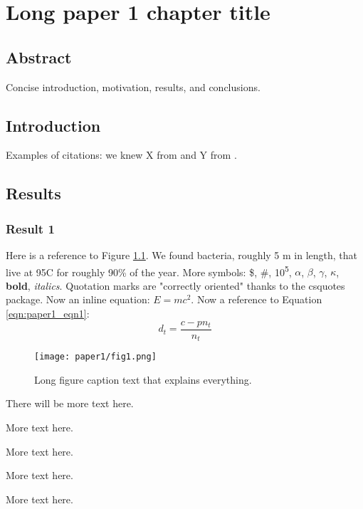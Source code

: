 \documentclass[main.tex]{subfiles}
\begin{document}
\chapter{Long paper 1 chapter title}

\section{Abstract}
Concise introduction, motivation, results, and conclusions.

\section{Introduction}
Examples of citations: we knew X from \cite{Croote201616022} and Y from \cite{Croote20181306}.

\section{Results}
\subsection{Result 1}
Here is a reference to Figure \ref{fig:paper1_fig1}.
We found bacteria, roughly 5 \si{\mu}m in length, that live at 95\degree C for roughly 90\% of the year. More symbols: \$, \#, 10\textsuperscript{5}, $\alpha$, $\beta$, $\gamma$, $\kappa$, \textbf{bold}, \textit{italics}.
Quotation marks are "correctly oriented" thanks to the csquotes package.
Now an inline equation: $E = mc^2$. Now a reference to Equation \ref{eqn:paper1_eqn1}:
\begin{equation}\label{eqn:paper1_eqn1}
d_t = \frac{c - pn_t}{n_t}
\end{equation}

\begin{figure}[hbt!]
\centering
\texttt{[image: paper1/fig1.png]}
\caption[Short figure caption for List of Figures]{Long figure caption text that explains everything.}
\label{fig:paper1_fig1}
\end{figure}

There will be more text here.

More text here.

More text here.

More text here.

More text here.
\end{document}
